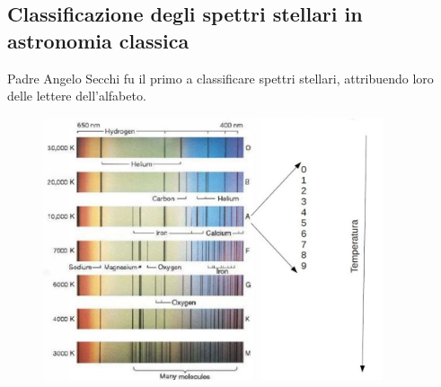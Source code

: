 \documentclass[a4paper,11pt]{article}
\begin{document}
     \subsection{Classificazione degli spettri stellari in astronomia classica}
     Padre Angelo Secchi fu il primo a classificare spettri stellari, attribuendo loro delle lettere dell'alfabeto.
     \begin{figure}[h!!]
            \centering
            \includegraphics[width=10cm]{angelo_secchi.jpg}
            \label{}
          \end{figure}
\end{document}
